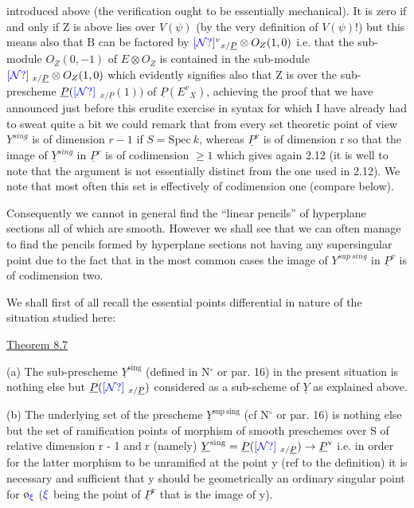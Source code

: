 \documentclass[11pt]{article}
\newcommand{\scanpage}[1]{\par\bigskip\noindent{\small\sffamily[scan #1]}\par}
\newcommand{\mspage}[1]{{\small\sffamily[p.\,#1]}}
\newcommand{\hand}[1]{\textcolor{blue}{#1}}
\newcommand{\uline}[1]{\underline{#1}}
\newcommand{\unsure}[1]{[#1?]}
\begin{document}
introduced above (the verification ought to be essentially
mechanical). It is zero if and only if Z is above lies over $V(\psi)$
(by the very definition of $V(\psi)$!) but this means also that B can
be factored by $\hand{\unsure{\mathcal{N}}}^{v}{}_{x/\underline{P}} \otimes O_{Z}(1,0)$ i.e. that the sub-module $O_{Z}(0,-1)$
of $E \otimes O_{Z}$ is contained in the sub-module $\hand{\unsure{\mathcal{N}}}\;{}_{x/\underline{P}} \otimes O_{Z}(1,0)$ which
evidently signifies also that Z is over the sub-prescheme $\underline{P}(\hand{\unsure{\mathcal{N}}}$
${}_{x/\underline{P}}(1))$ of $\underline{P}(E^{v}{}_{X})$, achieving the proof that we have announced just
before this erudite exercise in syntax for which I have already
had to sweat quite a bit we could remark that from every set
theoretic point of view $Y^{sing}$ is of dimension $r - 1$ if $S = \mathrm{Spec}\ k$,
whereas $\underline{P}^{v}$ is of dimension r so that the image of $\underline{Y}^{sing}$ in $\underline{P}^{v}$ is
of codimension $\geq 1$ which gives again 2.12 (it is well to note that
the argument is not essentially distinct from the one used in
2.12). We note that most often this set is effectively of
codimension one (compare below).

Consequently we cannot in general find the ``linear pencils''
of hyperplane sections all of which are smooth. However we shall
see that we can often manage to find the pencils formed by
hyperplane sections not having any supersingular point due to the
fact that in the most common cases the image of $Y^{sup\ sing}$ in $\underline{P}^{v}$ is
of codimension two.

We shall first of all recall the essential points
differential in nature of the situation studied here:

\clearpage
\scanpage{24/48}
\mspage{48}

\uline{Theorem 8.7}

(a) The sub-prescheme $\underline{Y}^{\mathrm{sing}}$ (defined in N$^\circ$ or par. 16) in the
present situation is nothing else but $\underline{P}(\hand{\unsure{\mathcal{N}}}_{\ x/\underline{P}})$ considered as a
sub-scheme of $\underline{Y}$ as explained above.

(b) The underlying set of the prescheme $\underline{Y}^{\mathrm{sup\ sing}}$ (cf N$^\circ$ or
par. 16) is nothing else but the set of ramification points of
morphism of smooth preschemes over S of relative dimension r - 1
and r (namely) $\underline{Y}^{\mathrm{sing}} = \underline{P}(\hand{\unsure{\mathcal{N}}}_{\ x/\underline{P}}) \rightarrow \underline{P}^{\mathrm{v}}$ i.e. in order for the latter
morphism to be unramified at the point y (ref to the definition)
it is necessary and sufficient that y should be geometrically an
ordinary singular point for $\text{ø}_{\hand{\xi}}$ ($\hand{\xi}$ being the point of $\underline{P}^{\mathrm{v}}$ that is the
image of y).
\end{document}
